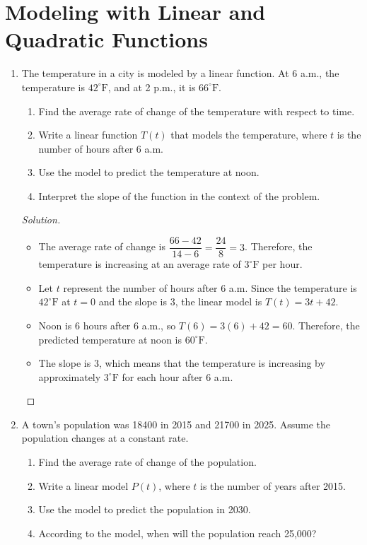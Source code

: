 \documentclass[12pt]{article}
\newenvironment{solution}{\begin{proof}[Solution]}{\end{proof}}
\begin{document}
	\newpage
	
	\section{Modeling with Linear and Quadratic Functions}
	

	\begin{enumerate}
		
		\item The temperature in a city is modeled by a linear function. At 6 a.m., the temperature is $42^\circ\text{F}$, and at 2 p.m., it is $66^\circ\text{F}$.
		
		\begin{enumerate}
			\item Find the average rate of change of the temperature with respect to time.
			\item Write a linear function $T(t)$ that models the temperature, where $t$ is the number of hours after 6 a.m.
			\item Use the model to predict the temperature at noon.
			\item Interpret the slope of the function in the context of the problem.
		\end{enumerate}
		
		\begin{solution}
			\begin{itemize} 
				\item[(a)] The average rate of change is $\dfrac{66-42}{14-6}=\dfrac{24}{8}=3$. Therefore, the temperature is increasing at an average rate of $3^\circ\text{F}$ per hour. 
				\item[(b)] Let $t$ represent the number of hours after 6 a.m. Since the temperature is $42^\circ\text{F}$ at $t=0$ and the slope is $3$, the linear model is $T(t)=3t+42.$ 
				\item[(c)] Noon is 6 hours after 6 a.m., so $T(6)=3(6)+42=60$. Therefore, the predicted temperature at noon is $60^\circ\text{F}$. 
				\item[(d)] The slope is $3$, which means that the temperature is increasing by approximately $3^\circ\text{F}$ for each hour after 6 a.m. 
				\end{itemize}
		\end{solution}
		
		\item A town's population was 18400 in 2015 and 21700 in 2025. Assume the population changes at a constant rate.
		
		\begin{enumerate}
			\item Find the average rate of change of the population.
			\item Write a linear model $P(t)$, where $t$ is the number of years after 2015.
			\item Use the model to predict the population in 2030.
			\item According to the model, when will the population reach 25,000?
		\end{enumerate}
		

\end{enumerate}
\end{document}
